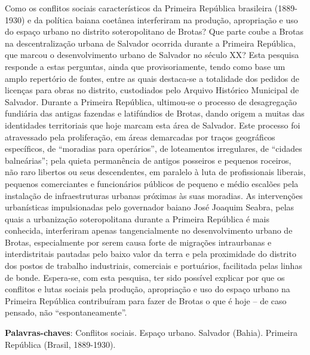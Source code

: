 
\setlength{\absparsep}{18pt} %
\begin{resumo}
Como os conflitos sociais característicos da Primeira República brasileira (1889-1930) e da política baiana coetânea interferiram na produção, apropriação e uso do espaço urbano no distrito soteropolitano de Brotas? Que parte coube a Brotas na descentralização urbana de Salvador ocorrida durante a Primeira República, que marcou o desenvolvimento urbano de Salvador no século XX? Esta pesquisa responde a estas perguntas, ainda que provisoriamente, tendo como base um amplo repertório de fontes, entre as quais destaca-se a totalidade dos pedidos de licenças para obras no distrito, custodiados pelo Arquivo Histórico Municipal de Salvador. Durante a Primeira República, ultimou-se o processo de desagregação fundiária das antigas fazendas e latifúndios de Brotas, dando origem a muitas das identidades territoriais que hoje marcam esta área de Salvador. Este processo foi atravessado pela proliferação, em áreas demarcadas por traços geográficos específicos, de ``moradias para operários'', de loteamentos irregulares, de ``cidades balneárias''; pela quieta permanência de antigos posseiros e pequenos roceiros, não raro libertos ou seus descendentes, em paralelo à luta de profissionais liberais, pequenos comerciantes e funcionários públicos de pequeno e médio escalões pela instalação de infraestruturas urbanas próximas às suas moradias. As intervenções urbanísticas impulsionadas pelo governador baiano José Joaquim Seabra, pelas quais a urbanização soteropolitana durante a Primeira República é mais conhecida, interferiram apenas tangencialmente no desenvolvimento urbano de Brotas, especialmente por serem causa forte de migrações intraurbanas e interdistritais pautadas pelo baixo valor da terra e pela proximidade do distrito dos postos de trabalho industriais, comerciais e portuários, facilitada pelas linhas de bonde. Espera-se, com esta pesquisa, ter sido possível explicar por que os conflitos e lutas sociais pela produção, apropriação e uso do espaço urbano na Primeira República contribuíram para fazer de Brotas o que é hoje -- de caso pensado, não ``espontaneamente''. 

\vspace{\onelineskip}
 
   \noindent 

 \textbf{Palavras-chaves}: Conflitos sociais. Espaço urbano. Salvador (Bahia). Primeira República (Brasil, 1889-1930).
\end{resumo}

